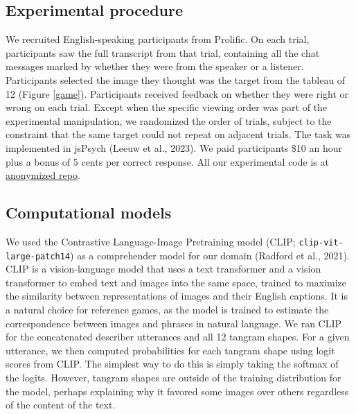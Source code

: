 \documentclass[10pt, letterpaper]{article}
\begin{document}
\subsection{Experimental procedure}\label{experimental-procedure}

We recruited English-speaking participants from Prolific. On each trial,
participants saw the full transcript from that trial, containing all the
chat messages marked by whether they were from the speaker or a
listener. Participants selected the image they thought was the target
from the tableau of 12 (Figure \ref{game}). Participants received
feedback on whether they were right or wrong on each trial. Except when
the specific viewing order was part of the experimental manipulation, we
randomized the order of trials, subject to the constraint that the same
target could not repeat on adjacent trials. The task was implemented in
jsPsych (Leeuw et al., 2023). We paid participants \$10 an hour plus a
bonus of 5 cents per correct response. All our experimental code is at
\href{https://osf.io/bfk8y/?view_only=165b81c5d69446f18e1bfd23e3d9cb5f}{anonymized
repo}.

\subsection{Computational models}\label{computational-models}

We used the Contrastive Language-Image Pretraining model (CLIP;
\texttt{clip-vit-large-patch14}) as a comprehender model for our domain
(Radford et al., 2021). CLIP is a vision-language model that uses a text
transformer and a vision transformer to embed text and images into the
same space, trained to maximize the similarity between representations
of images and their English captions. It is a natural choice for
reference games, as the model is trained to estimate the correspondence
between images and phrases in natural language. We ran CLIP for the
concatenated describer utterances and all 12 tangram shapes. For a given
utterance, we then computed probabilities for each tangram shape using
logit scores from CLIP. The simplest way to do this is simply taking the
softmax of the logits. However, tangram shapes are outside of the
training distribution for the model, perhaps explaining why it favored
some images over others regardless of the content of the text.
\end{document}
